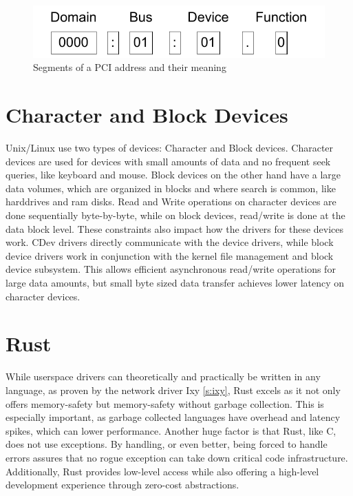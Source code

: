 \begin{figure}
    \centering
    \includegraphics[width=\textwidth]{figures/PCIAddress.pdf}
    \caption{Segments of a PCI address and their meaning}
    \label{fig:pciaddress}
\end{figure}

\section{Character and Block Devices}
Unix/Linux use two types of devices: Character and Block devices. Character devices are used for devices with small amounts of data and no frequent seek queries, like keyboard and mouse. Block devices on the other hand have a large data volumes, which are organized in blocks and where search is common, like harddrives and ram disks.
Read and Write operations on character devices are done sequentially byte-by-byte, while on block devices, read/write is done at the data block level.
These constraints also impact how the drivers for these devices work. CDev drivers directly communicate with the device drivers, while block device drivers work in conjunction with the kernel file management and block device subsystem. This allows efficient asynchronous read/write operations for large data amounts, but small byte sized data transfer achieves lower latency on character devices.

\section{Rust}
While userspace drivers can theoretically and practically be written in any language, as proven by the network driver Ixy \autoref{s:ixy}, Rust excels as it not only offers memory-safety but memory-safety without garbage collection. This is especially important, as garbage collected languages have overhead and latency spikes, which can lower performance. Another huge factor is that Rust, like C, does not use exceptions. By handling, or even better, being forced to handle errors assures that no rogue exception can take down critical code infrastructure.
Additionally, Rust provides low-level access while also offering a high-level development experience through zero-cost abstractions.